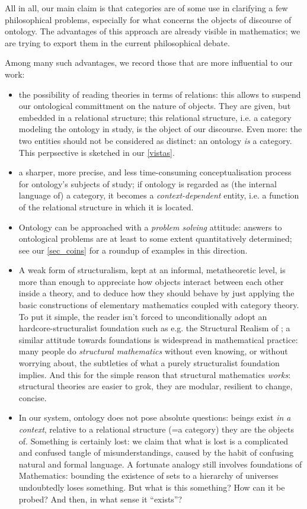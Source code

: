 All in all, our main claim is that categories are of some use in clarifying a few philosophical problems, especially for what concerns the objects of discourse of ontology. The advantages of this approach are already visible in mathematics; we are trying to export them in the current philosophical debate.

Among many such advantages, we record those that are more influential to our work:
\begin{itemize}
	\item the possibility of reading theories in terms of relations: this allows to suspend our ontological committment on the nature of objects. They are given, but embedded in a relational structure; this relational structure, i.e. a category modeling the ontology in study, is the object of our discourse. Even more: the two entities should not be considered as distinct: an ontology \emph{is} a category. This perpsective is sketched in our \autoref{vistas}.
	\item a sharper, more precise, and less time-consuming conceptualisation process for ontology's subjects of study; if ontology is regarded as (the internal language of) a category, it becomes a \emph{context-dependent} entity, i.e. a function of the relational structure in which it is located.
	\item Ontology can be approached with a \emph{problem solving} attitude: answers to ontological problems are at least to some extent quantitatively determined; see our \autoref{sec_coins} for a roundup of examples in this direction.
	\item A weak form of structuralism, kept at an informal, metatheoretic level, is more than enough to appreciate how objects interact between each other inside a theory, and to deduce how they should behave by just applying the basic constructions of elementary mathematics coupled with category theory. To put it simple, the reader isn't forced to unconditionally adopt an hardcore-structuralist foundation such as e.g. the Structural Realism of \cite{}; a similar attitude towards foundations is widespread in mathematical practice: many people do \textit{structural mathematics} without even knowing, or without worrying about, the subtleties of what a purely structuralist foundation implies. And this for the simple reason that structural mathematics \emph{works}: structural theories are easier to grok, they are modular, resilient to change, concise.
	\item In our system, ontology does not pose absolute questions: beings exist \emph{in a context}, relative to a relational structure (=a category) they are the objects of. Something is certainly lost: we claim that what is lost is a complicated and confused tangle of misunderstandings, caused by the habit of confusing natural and formal language. A fortunate analogy still involves foundations of Mathematics: bounding the existence of sets to a hierarchy of universes undoubtedly loses something. But what is this something? How can it be probed? And then, in what sense it ``exists''?

\end{itemize}
